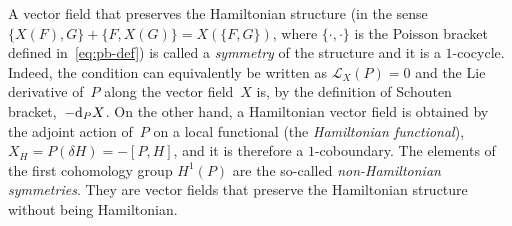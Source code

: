 \documentclass[pdftex]{sigma}
\numberwithin{equation}{section}
\begin{document}
A vector field that preserves the Hamiltonian structure (in the sense $\{X(F),G\}+\{F,X(G)\}=X(\{F,G\})$, where $\{\cdot,\cdot\}$ is the Poisson bracket defined in~\eqref{eq:pb-def}) is called a \emph{symmetry} of the structure and it is a $1$-cocycle. Indeed, the condition can equivalently be written as $\mathcal{L}_X(P)=0$ and the Lie derivative of~$P$ along the vector field~$X$ is, by the definition of Schouten bracket,~$-{\rm d}_PX$. On the other hand, a Hamiltonian vector field is obtained by the adjoint action of~$P$ on a local functional (the \emph{Hamiltonian functional}), $X_H=P(\delta H)=-[P,H]$, and it is therefore a $1$-coboundary. The elements of the first cohomology group $H^1(P)$ are the so-called \emph{non-Hamiltonian symmetries}. They are vector fields that preserve the Hamiltonian structure without being Hamiltonian.
\end{document}
